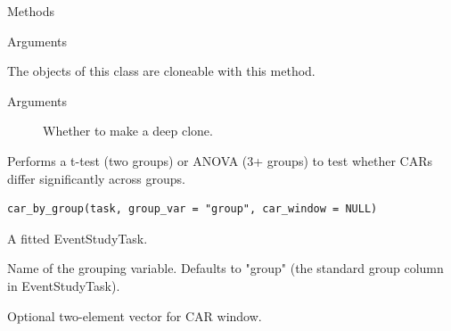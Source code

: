 \documentclass[a4paper]{book}
\begin{document}
\begin{Section}{Methods}
\begin{SubSection}{}
\begin{SubSubSection}{Arguments}
\end{SubSubSection}

\end{SubSection}




\hypertarget{method-CARTTest-clone}{}
%
\begin{SubSection}{}
The objects of this class are cloneable with this method.
%

%
\begin{SubSubSection}{Arguments}

\begin{description}

\item[] Whether to make a deep clone.

\end{description}



\end{SubSubSection}

\end{SubSection}


\end{Section}
%
\begin{Description}
Performs a t-test (two groups) or ANOVA (3+ groups) to test whether
CARs differ significantly across groups.
\end{Description}
%
\begin{Usage}
\begin{verbatim}
car_by_group(task, group_var = "group", car_window = NULL)
\end{verbatim}
\end{Usage}
%
\begin{Arguments}
\begin{ldescription}
\item[\code{task}] A fitted EventStudyTask.

\item[\code{group\_var}] Name of the grouping variable. Defaults to "group"
(the standard group column in EventStudyTask).

\item[\code{car\_window}] Optional two-element vector for CAR window.
\end{ldescription}
\end{Arguments}
\end{document}
